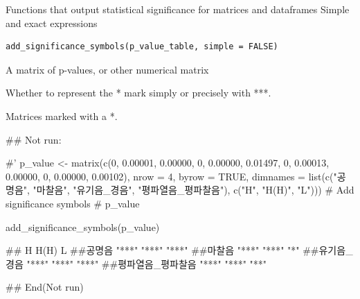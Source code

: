 \documentclass[a4paper]{book}
\begin{document}
%
\begin{Description}
Functions that output statistical significance for matrices and dataframes Simple and exact expressions
\end{Description}
%
\begin{Usage}
\begin{verbatim}
add_significance_symbols(p_value_table, simple = FALSE)
\end{verbatim}
\end{Usage}
%
\begin{Arguments}
\begin{ldescription}
\item[\code{p\_value\_table}] A matrix of p-values, or other numerical matrix

\item[\code{simple}] Whether to represent the * mark simply or precisely with ***.
\end{ldescription}
\end{Arguments}
%
\begin{Value}
Matrices marked with a *.
\end{Value}
%
\begin{Examples}
\begin{ExampleCode}

 ## Not run: 

 #' p_value <- matrix(c(0, 0.00001, 0.00000,
                    0, 0.00000, 0.01497,
                    0, 0.00013, 0.00000,
                    0, 0.00000, 0.00102),
                  nrow = 4, byrow = TRUE,
                  dimnames = list(c("공명음", "마찰음", "유기음_경음", "평파열음_평파찰음"),
                                  c("H", "H(H)", "L")))
     # Add significance symbols
     # p_value

     add_significance_symbols(p_value)

 ##                  H     H(H)  L
 ##공명음            "***" "***" "***"
 ##마찰음            "***" "***" "*"
 ##유기음_경음       "***" "***" "***"
 ##평파열음_평파찰음 "***" "***" "**"




 
## End(Not run)


\end{ExampleCode}
\end{Examples}
\end{document}
